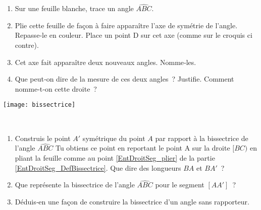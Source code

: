 
\begin{activite}

 \begin{partie}[Définition] \label{EntDroitSeg_DefBissectrice}

 \begin{minipage}[c]{0.68\linewidth}
 \begin {enumerate}
  \item Sur une feuille blanche, trace un angle $\widehat{ABC}$.
  \item Plie cette feuille de façon à faire apparaître l'axe de symétrie de l'angle. Repasse‑le en couleur. Place un point D sur cet axe (comme sur le croquis ci contre). \label{EntDroitSeg_plier}
  \item Cet axe fait apparaître deux nouveaux angles. Nomme‑les.
  \item Que peut‑on dire de la mesure de ces deux angles ? Justifie. Comment nomme‑t‑on cette droite ?
  \end{enumerate} 
  \end{minipage} \hfill %
 \begin{minipage}[c]{0.26\linewidth}
 \texttt{[image: bissectrice]}
  \end{minipage} \\
  
 \end{partie}
 
 \begin{partie}
 
 \begin{enumerate}
 \item Construis le point $A'$ symétrique du point $A$ par rapport à la bissectrice de l'angle $\widehat{ABC}$ Tu obtiens ce point en reportant le point A sur la droite $[BC)$ en pliant la feuille comme au point \ref{EntDroitSeg_plier} de la partie \ref{EntDroitSeg_DefBissectrice}. Que dire des longueurs $BA$ et $BA'$ ?
 \item Que représente la bissectrice de l'angle $\widehat{ABC}$ pour le segment $[AA']$ ?
 \item Déduis‑en une façon de construire la bissectrice d'un angle sans rapporteur.
  \end{enumerate}              
  \end{partie}
 
\end{activite}

